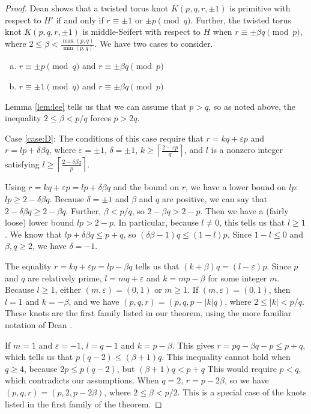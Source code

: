 \documentclass{amsart}
\newcommand{\eps}{\varepsilon}
\newcommand{\ds}{\displaystyle}
\begin{document}
\begin{proof}
Dean \cite{DeanSFSSurgeries} shows that a twisted torus knot $K(p,q,r, \pm 1)$ is primitive with respect to $H'$ if and only if $r \equiv \pm 1$ or $\pm p \pmod q$. Further, the twisted torus knot $K(p,q,r, \pm 1)$ is middle-Seifert with respect to $H$ when $r \equiv \pm \beta q \pmod p$, where $2 \le \beta < \frac{\max(p,q)}{\min(p,q)}$. We have two cases to consider.
\begin{enumerate}[(a)]
\item\label{case:D} $r \equiv \pm p \pmod q$ and $r \equiv \pm \beta q \pmod p$
\item\label{case:A} $r \equiv \pm 1 \pmod q$ and $r \equiv \pm \beta q \pmod p$
\end{enumerate}

Lemma \ref{lem:lee} tells us that we can assume that $p >q$, so as noted above, the inequality $2 \le \beta < p/q$ forces $p > 2q$.

Case \ref{case:D}: The conditions of this case require that $r = kq + \eps p$ and $r = l p + \delta \beta q$, where $\eps = \pm 1$, $\delta = \pm 1$, $\ds k \ge \left\lceil \frac{2-\eps p}{q} \right\rceil$,  and $l$ is a nonzero integer satisfying $\ds l \ge \left\lceil \frac{2-\delta\beta q}{p}\right\rceil$. 

Using $r= kq + \eps p = lp + \delta \beta q$ and the bound on $r$, we have a lower bound on $lp$: $lp \ge 2 - \delta \beta q$. Because $\delta = \pm 1$ and $\beta$ and $q$ are positive, we can say that $2 - \delta \beta q \ge 2 - \beta q$. Further, $\beta < p/q$, so $ 2- \beta q > 2 - p$. Then we have a (fairly loose) lower bound $ lp > 2-p$. In particular, because $l \neq 0$, this tells us that $l \ge 1$. We know that  $lp + \delta \beta q \le p + q$, so $(\delta \beta -1) q \le (1-l)p$. Since $1-l \le 0$ and $\beta, q \ge 2$, we have $\delta = -1$. 

The equality $r= kq + \eps p = lp - \beta q$ tells us that $(k+ \beta )q = (l-\eps)p$. Since $p$ and $q$ are relatively prime,  $l = mq + \eps$ and $k = mp - \beta$ for some integer $m$. Because $l \ge 1$, either $(m,\eps)= (0,1)$ or $ m\ge 1$. If $(m,\eps)= (0,1)$, then $l = 1$ and $k = -\beta$, and we have $(p,q,r) = (p, q, p - |k| q)$, where $2 \le |k| < p/q$. These knots are the first family listed in our theorem, using the more familiar notation of Dean \cite{DeanSFSSurgeries}.

If $m = 1$ and $\eps = -1$, $l = q-1$ and $k = p - \beta$. This gives $r = pq - \beta q - p \le p + q$, which tells us that $p(q-2) \le (\beta +1)q$. This inequality cannot hold when $q\ge 4$, because $2p\le p(q-2)$, but $(\beta +1)q < p+q$ This would require $p<q$, which contradicts our assumptions. When $q = 2$, $r = p - 2\beta$, so we have $(p,q,r) = (p, 2, p - 2\beta)$, where $2 \le \beta < p/2$. This is a special case of the knots listed in the first family of the theorem. 


\end{proof}
\end{document}
